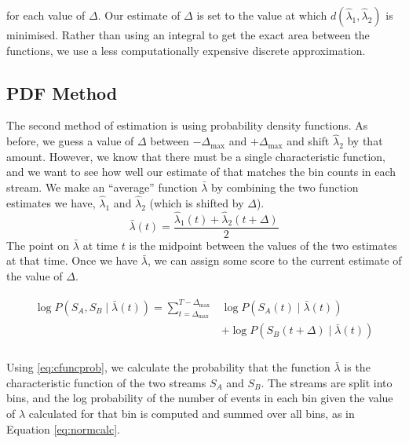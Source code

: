 \documentclass[a4paper,11pt]{article}
\begin{document}
   for each value of $\Delta$. Our estimate of $\Delta$ is set to the value at
   which $d(\hat{\lambda}_1,\hat{\lambda}_2)$ is minimised. Rather than using an
   integral to get the exact area between the functions, we use a less
   computationally expensive discrete approximation.
\subsection{PDF Method}
\label{sec-4-2}

   The second method of estimation is using probability density functions. As
   before, we guess a value of $\Delta$ between $-\Delta_{\text{max}}$ and
   $+\Delta_{\text{max}}$ and shift $\hat{\lambda}_2$ by that amount. However,
   we know that there must be a single characteristic function, and we want to
   see how well our estimate of that matches the bin counts in each stream. We
   make an ``average'' function $\bar{\lambda}$ by combining the two function
   estimates we have, $\hat{\lambda}_1$ and $\hat{\lambda}_2$ (which is shifted
   by $\Delta$).
   \begin{equation}
   \bar{\lambda}(t)=\frac{\hat{\lambda}_1(t)+\hat{\lambda}_2(t+\Delta)}{2}
   \end{equation}
   The point on $\bar{\lambda}$ at time $t$ is the midpoint between the values of
   the two estimates at that time. Once we have $\bar{\lambda}$, we can assign some
   score to the current estimate of the value of $\Delta$.

   \begin{align}
   \begin{split}
   \log P(S_A,S_B\mid\bar{\lambda}(t))=\sum_{t=\Delta_{\text{max}}}^{T-\Delta_{\text{max}}}&\log P(S_A(t)\mid \bar{\lambda}(t))\\
   &+ \log P(S_B(t+\Delta)\mid \bar{\lambda}(t))\\
   \label{eq:cfuncprob}
   \end{split}
   \end{align}
   
   Using \eqref{eq:cfuncprob}, we calculate the probability that the function $\bar{\lambda}$ is the
   characteristic function of the two streams $S_A$ and $S_B$. The streams are
   split into bins, and the log probability of the number of events in each bin
   given the value of $\lambda$ calculated for that bin is computed and summed
   over all bins, as in Equation \eqref{eq:normcalc}.
\end{document}
